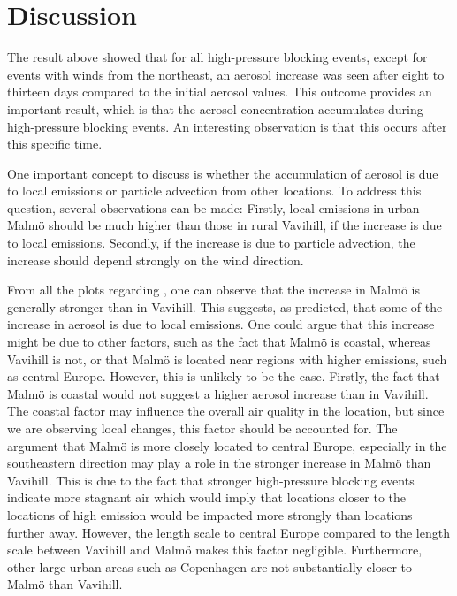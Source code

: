 \newpage
\section{Discussion}
The result above showed that for all high-pressure blocking events, except for events with winds from the northeast, an aerosol increase was seen after eight to thirteen days compared to the initial aerosol values. This outcome provides an important result, which is that the aerosol concentration accumulates during high-pressure blocking events. An interesting observation is that this occurs after this specific time. 

One important concept to discuss is whether the accumulation of aerosol is due to local emissions or particle advection from other locations. To address this question, several observations can be made: Firstly, local emissions in urban Malmö should be much higher than those in rural Vavihill, if the increase is due to local emissions. Secondly, if the increase is due to particle advection, the increase should depend strongly on the wind direction. 

From all the plots regarding \PM, one can observe that the increase in Malmö is generally stronger than in Vavihill. This suggests, as predicted, that some of the increase in aerosol is due to local emissions. One could argue that this increase might be due to other factors, such as the fact that Malmö is coastal, whereas Vavihill is not, or that Malmö is located near regions with higher emissions, such as central Europe. However, this is unlikely to be the case. Firstly, the fact that Malmö is coastal would not suggest a higher aerosol increase than in Vavihill. The coastal factor may influence the overall air quality in the location, but since we are observing local changes, this factor should be accounted for. The argument that Malmö is more closely located to central Europe, especially in the southeastern direction may play a role in the stronger increase in Malmö than Vavihill. This is due to the fact that stronger high-pressure blocking events indicate more stagnant air which would imply that locations closer to the locations of high emission would be impacted more strongly than locations further away. However, the length scale to central Europe compared to the length scale between Vavihill and Malmö makes this factor negligible. Furthermore, other large urban areas such as Copenhagen are not substantially closer to Malmö than Vavihill. 

